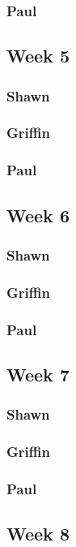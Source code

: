 \documentclass[10pt,draftclsnofoot,onecolumn]{IEEEtran}
\begin{document}
\subsubsection{Paul}

\subsection{Week 5}
\subsubsection{Shawn}
\subsubsection{Griffin}
\subsubsection{Paul}

\subsection{Week 6}
\subsubsection{Shawn}
\subsubsection{Griffin}
\subsubsection{Paul}

\subsection{Week 7}
\subsubsection{Shawn}
\subsubsection{Griffin}
\subsubsection{Paul}

\subsection{Week 8}
\end{document}

